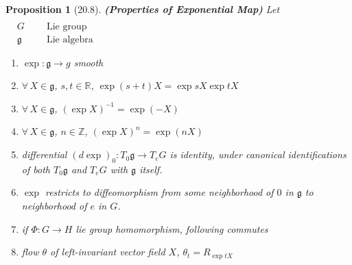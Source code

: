 \documentclass[11pt]{amsart}
\newtheorem{proposition}{Proposition}
\theoremstyle{definition}
\begin{document}
\begin{proposition}[20.8] \textbf{(Properties of Exponential Map)} Let $\begin{aligned} & \quad \\
    & G \quad \, & \text{ Lie group } \\
    & \mathfrak{g} \quad \, & \text{ Lie algebra } \end{aligned}$

\begin{enumerate}
\item[(a)] $\exp: \mathfrak{g} \to g$ smooth
\item[(b)] $\forall \, X \in \mathfrak{g}$, $s,t\in \mathbb{R}$, $\exp{(s+t)}X = \exp{sX}\exp{tX}$
\item[(c)] $\forall \, X \in \mathfrak{g}$, $(\exp{X})^{-1} = \exp{(-X)}$
\item[(d)] $\forall \, X \in \mathfrak{g}$, $n\in \mathbb{Z}$, $(\exp{X})^n = \exp{(nX)}$
\item[(e)] differential $(d\exp)_0:T_0\mathfrak{g} \to T_eG$ is identity, under canonical identifications of both $T_0\mathfrak{g}$ and $T_eG$ with $\mathfrak{g}$ itself.
\item[(f)] $\exp$ restricts to diffeomorphism from some neighborhood of $0$ in $\mathfrak{g}$ to neighborhood of $e$ in $G$.
\item[(g)] if $\Phi:G\to H$ lie group homomorphism, following commutes




\item[(h)] flow $\theta$ of left-invariant vector field $X$, $\theta_t = R_{\exp{tX}}$
\end{enumerate}
\end{proposition}
\end{document}
